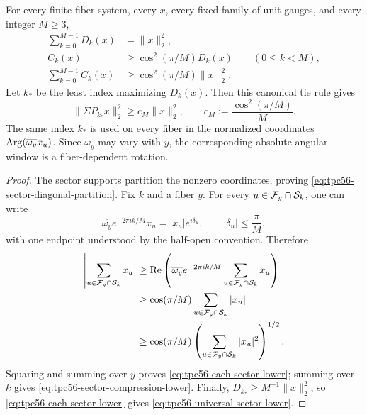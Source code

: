 \begin{theorem}
\label{thm:tpc56-equal-sector-selection}
For every finite fiber system, every \(x\), every fixed family of unit
gauges, and every integer \(M\ge3\),
\begin{align}
 \sum_{k=0}^{M-1}D_k(x)
 &=\|x\|_2^2,
 \label{eq:tpc56-sector-diagonal-partition}\\
 C_k(x)&\ge\cos^2(\pi/M)D_k(x)
 \qquad(0\le k<M),
 \label{eq:tpc56-each-sector-lower}\\
 \sum_{k=0}^{M-1}C_k(x)
 &\ge\cos^2(\pi/M)\|x\|_2^2.
 \label{eq:tpc56-sector-compression-lower}
\end{align}
Let \(k_*\) be the least index maximizing \(D_k(x)\).  Then this canonical
tie rule gives
\begin{equation}
 \boxed{
 \|\Sigma P_{k_*}x\|_2^2
 \ge c_M\|x\|_2^2,
 \qquad
 c_M:=\frac{\cos^2(\pi/M)}M.}
 \label{eq:tpc56-universal-sector-lower}
\end{equation}
The same index \(k_*\) is used on every fiber in the normalized coordinates
\(\operatorname{Arg}(\overline{\omega_y}x_u)\).  Since \(\omega_y\) may vary with \(y\),
the corresponding absolute angular window is a fiber-dependent rotation.
\end{theorem}

\begin{proof}
The sector supports partition the nonzero coordinates, proving
\eqref{eq:tpc56-sector-diagonal-partition}.  Fix \(k\) and a fiber \(y\).
For every \(u\in\mathcal F_y\cap\mathcal S_k\), one can write
\begin{equation}
 \overline{\omega_y}e^{-2\pi i k/M}x_u
 =|x_u|e^{i\delta_u},
 \qquad |\delta_u|\le\frac\pi M,
 \label{eq:tpc56-sector-angle-form}
\end{equation}
with one endpoint understood by the half-open convention.  Therefore
\begin{align}
 \left|\sum_{u\in\mathcal F_y\cap\mathcal S_k}x_u\right|
 &\ge
 \operatorname{Re}\left(
 \overline{\omega_y}e^{-2\pi i k/M}
 \sum_{u\in\mathcal F_y\cap\mathcal S_k}x_u\right)\notag\\
 &\ge\cos(\pi/M)
 \sum_{u\in\mathcal F_y\cap\mathcal S_k}|x_u|\notag\\
 &\ge\cos(\pi/M)
 \left(\sum_{u\in\mathcal F_y\cap\mathcal S_k}|x_u|^2\right)^{1/2}.
 \label{eq:tpc56-fiber-sector-proof}
\end{align}
Squaring and summing over \(y\) proves
\eqref{eq:tpc56-each-sector-lower}; summing over \(k\) gives
\eqref{eq:tpc56-sector-compression-lower}.  Finally,
\(D_{k_*}\ge M^{-1}\|x\|_2^2\), so
\eqref{eq:tpc56-each-sector-lower} gives
\eqref{eq:tpc56-universal-sector-lower}.
\end{proof}

